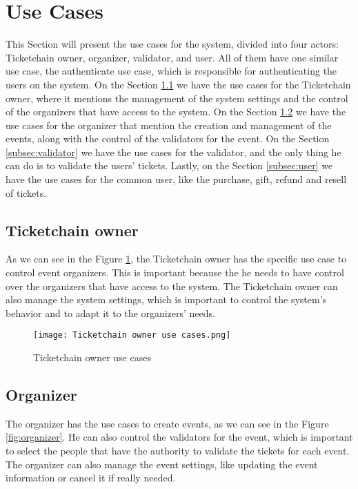 \section{Use Cases}
\label{sec:use_cases}

This Section will present the use cases for the system, divided into four
actors: Ticketchain owner, organizer, validator, and user. All of them have one
similar use case, the authenticate use case, which is responsible for
authenticating the users on the system. On the Section
\ref{subsec:ticketchain_owner} we have the use cases for the Ticketchain owner,
where it mentions the management of the system settings and the control of the
organizers that have access to the system. On the Section
\ref{subsec:organizer} we have the use cases for the organizer that mention the
creation and management of the events, along with the control of the validators
for the event. On the Section \ref{subsec:validator} we have the use cases for
the validator, and the only thing he can do is to validate the users' tickets.
Lastly, on the Section \ref{subsec:user} we have the use cases for the common
user, like the purchase, gift, refund and resell of tickets.

\subsection{Ticketchain owner}
\label{subsec:ticketchain_owner}

As we can see in the Figure \ref{fig:ticketchain_owner_use_cases}, the
Ticketchain owner has the specific use case to control event organizers. This
is important because the he needs to have control over the organizers that have
access to the system. The Ticketchain owner can also manage the system
settings, which is important to control the system's behavior and to adapt it
to the organizers' needs.

\begin{figure}[H]
    \texttt{[image: Ticketchain owner use cases.png]}
    \centering
    \caption{Ticketchain owner use cases}
    \label{fig:ticketchain_owner_use_cases}
\end{figure}

\subsection{Organizer}
\label{subsec:organizer}

The organizer has the use cases to create events, as we can see in the Figure
\ref{fig:organizer}. He can also control the validators for the event, which is
important to select the people that have the authority to validate the tickets
for each event. The organizer can also manage the event settings, like updating
the event information or cancel it if really needed.

